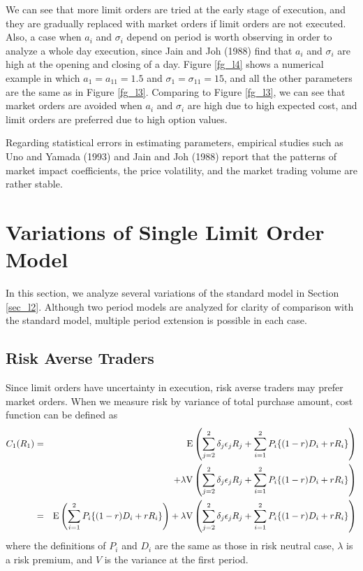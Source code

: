 We can see that more limit orders are tried at the early stage of execution, and they are gradually replaced with market orders if limit orders are not executed.  Also, a case when $a_i$ and $\sigma_i$ depend on period is worth observing in order to analyze a whole day execution, since Jain and Joh (1988) find that $a_i$ and $\sigma_i$ are high at the opening and closing of a day.  Figure \ref{fg_l4} shows a numerical example in which $a_1=a_{11}=1.5$ and $\sigma_1=\sigma_{11}=15$, and all the other parameters are the same as in Figure \ref{fg_l3}.  Comparing to Figure \ref{fg_l3}, we can see that market orders are avoided when  $a_i$ and $\sigma_i$ are high due to high expected cost, and limit orders are preferred due to high option values.

Regarding statistical errors in estimating parameters, empirical studies such as Uno and Yamada (1993) and Jain and Joh (1988) report that the patterns of market impact coefficients, the price volatility, and the market trading volume are rather stable.

\section{Variations of Single Limit Order Model}\label{sec_l3}
In this section, we analyze several variations of the standard model in Section \ref{sec_l2}.  Although two period models are analyzed for clarity of comparison with the standard model, multiple period extension is possible in each case.

\subsection{Risk Averse Traders}
Since limit orders have uncertainty in execution, risk averse traders may prefer market orders.  When we measure risk by variance of total purchase amount, cost function can be defined as
\begin{eqnarray}\label{eq_l21}
  C_1(R_1) & = & {\mathrm{E}}\left(  \sum_{j=2}^2 \delta_j \epsilon_j R_j + \sum_{i=1}^2 P_i \{(1-r) D_i +r R_i\} \right) \nonumber \\
      &   & +\lambda {\mathrm{V}}\left(  \sum_{j=2}^2 \delta_j \epsilon_j R_j + \sum_{i=1}^2 P_i \{(1-r) D_i +r R_i\} \right) \nonumber \\
      & = & {\mathrm{E}}\left(  \sum_{i=1}^2 P_i \{(1-r) D_i +r R_i\} \right)+\lambda {\mathrm{V}}\left( \sum_{j=2}^2 \delta_j \epsilon_j R_j + \sum_{i=1}^2 P_i \{(1-r) D_i +r R_i\} \right)
\end{eqnarray}
where the definitions of $P_i$ and $D_i$ are the same as those in risk neutral case, $\lambda$ is a risk premium, and $V$ is the variance at the first period.

